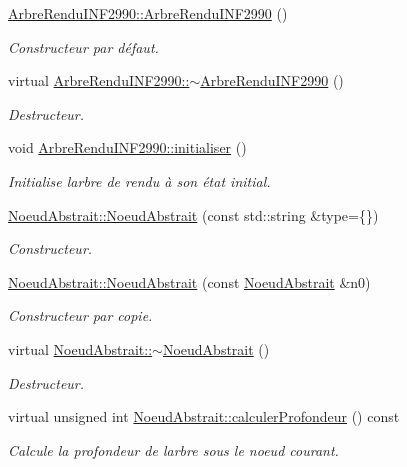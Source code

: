 \begin{DoxyCompactItemize}
\hyperlink{group__inf2990_ga67528b7fa54e8ef8f96ef2e0bad06d2d}{Arbre\+Rendu\+I\+N\+F2990\+::\+Arbre\+Rendu\+I\+N\+F2990} ()
\begin{DoxyCompactList}\small\item\em Constructeur par défaut. \end{DoxyCompactList}\item 
virtual \hyperlink{group__inf2990_gaa67526b2fd719f6bcef7a4547bd25c7b}{Arbre\+Rendu\+I\+N\+F2990\+::$\sim$\+Arbre\+Rendu\+I\+N\+F2990} ()
\begin{DoxyCompactList}\small\item\em Destructeur. \end{DoxyCompactList}\item 
void \hyperlink{group__inf2990_ga678d89e1f12ae16ee7dcf6de3db637a3}{Arbre\+Rendu\+I\+N\+F2990\+::initialiser} ()
\begin{DoxyCompactList}\small\item\em Initialise l\textquotesingle{}arbre de rendu à son état initial. \end{DoxyCompactList}\item 
\hyperlink{group__inf2990_gad1eae42fe2bccef56f55b8a52726657f}{Noeud\+Abstrait\+::\+Noeud\+Abstrait} (const std\+::string \&type=\{\})
\begin{DoxyCompactList}\small\item\em Constructeur. \end{DoxyCompactList}\item 
\hyperlink{group__inf2990_gae7bea8d23c4dad60c334fc6806d08d01}{Noeud\+Abstrait\+::\+Noeud\+Abstrait} (const \hyperlink{class_noeud_abstrait}{Noeud\+Abstrait} \&n0)
\begin{DoxyCompactList}\small\item\em Constructeur par copie. \end{DoxyCompactList}\item 
virtual \hyperlink{group__inf2990_ga0ab3f7ab838e8349113da5074abcdc3a}{Noeud\+Abstrait\+::$\sim$\+Noeud\+Abstrait} ()
\begin{DoxyCompactList}\small\item\em Destructeur. \end{DoxyCompactList}\item 
virtual unsigned int \hyperlink{group__inf2990_gad854800087fd6c13f1a63589caefb41d}{Noeud\+Abstrait\+::calculer\+Profondeur} () const 
\begin{DoxyCompactList}\small\item\em Calcule la profondeur de l\textquotesingle{}arbre sous le noeud courant. \end{DoxyCompactList}\item 

\end{DoxyCompactItemize}
